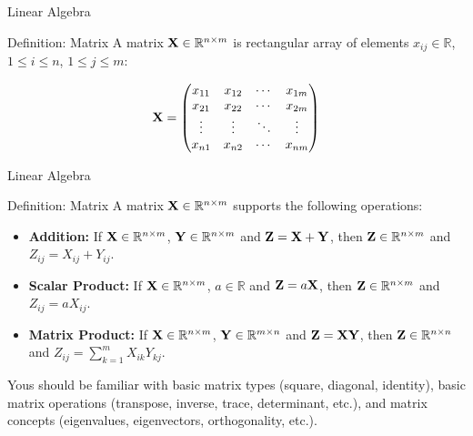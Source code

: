 \documentclass[serif,xcolor=pdftex,dvipsnames,table,hyperref={bookmarks=false,breaklinks}]{beamer}
\begin{document}
\begin{frame}[t]{Linear Algebra}

\begin{block}{Definition: Matrix}
  A matrix ${\mathbf{X}}\in \mathbb{R}^{n\times m}$ is rectangular array of elements $x_{ij}\in\mathbb{R}$, $1\leq i \leq n$, $1\leq j \leq m$:
  
  $${\mathbf{X}} =
 \begin{pmatrix}
  x_{11} & x_{12} & \cdots & x_{1m} \\
  x_{21} & x_{22} & \cdots & x_{2m} \\
  \vdots  & \vdots  & \ddots & \vdots  \\
  x_{n1} & x_{n2} & \cdots & x_{nm}
 \end{pmatrix}
  $$
  
\end{block}
\end{frame}

\begin{frame}[t]{Linear Algebra}

\begin{block}{Definition: Matrix}
  A matrix ${\mathbf{X}}\in \mathbb{R}^{n\times m}$ supports the following operations:
  
  \pause
  \begin{itemize}[<+->]
    \item \textbf{Addition:} If ${\mathbf{X}}\in \mathbb{R}^{n\times m}$, ${\mathbf{Y}}\in \mathbb{R}^{n\times m}$ and ${\mathbf{Z}}={\mathbf{X}}+{\mathbf{Y}}$, then  ${\mathbf{Z}}\in \mathbb{R}^{n\times m}$ and $Z_{ij}=X_{ij}+Y_{ij}$.

    \item \textbf{Scalar Product:} If ${\mathbf{X}}\in \mathbb{R}^{n\times m}$, $a\in \mathbb{R}$
    and ${\mathbf{Z}}=a{\mathbf{X}}$, then  ${\mathbf{Z}}\in \mathbb{R}^{n\times m}$ and $Z_{ij}=aX_{ij}$.
    
    \item \textbf{Matrix Product:} If ${\mathbf{X}}\in \mathbb{R}^{n\times m}$, ${\mathbf{Y}}\in \mathbb{R}^{m\times n}$ and ${\mathbf{Z}}={\mathbf{X}}{\mathbf{Y}}$, then  ${\mathbf{Z}}\in \mathbb{R}^{n\times n}$ and $Z_{ij}=\sum_{k=1}^mX_{ik}Y_{kj}$.

  \end{itemize}  
\end{block}

\pause Yous should be familiar with basic matrix types (square, diagonal, identity), basic matrix operations (transpose, inverse, trace, determinant, etc.), and matrix concepts (eigenvalues, eigenvectors, orthogonality, etc.). 

\end{frame}
\end{document}
